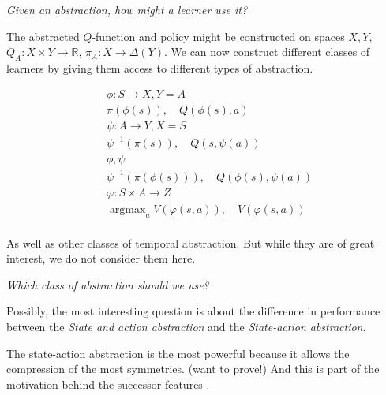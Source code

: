 %

\begin{displayquote}
\textit{Given an abstraction, how might a learner use it?}
\end{displayquote}

The abstracted $Q$-function and policy might be constructed on spaces $X, Y$,
$Q_A: X \times Y \to \mathbb R$, $\pi_A: X \to \Delta(Y)$. We can now construct
different classes of learners by giving them access to different types of abstraction.

\begin{align*}
&\phi: S \to X, Y = A \\
&\pi(\phi(s)),\quad Q(\phi(s), a) \tag{State abstraction} \\
&\psi: A\to Y, X = S\\
&\psi^{-1}(\pi(s)),\quad Q(s, \psi(a)) \tag{Action abstraction} \\
&\phi, \psi\\
&\psi^{-1}(\pi(\phi(s))),\quad Q(\phi(s), \psi(a)) \tag{State and action abstraction} \\
&\varphi: S \times A \to Z \\
&\mathop{\text{argmax}}_a V(\varphi(s, a)),\quad V(\varphi(s, a)) \tag{State-action abstraction} \\
\end{align*}

As well as other classes of temporal abstraction. But while they are of great
interest, we do not consider them here.

\begin{displayquote}
\textit{Which class of abstraction should we use?}
\end{displayquote}

Possibly, the most interesting question is about the difference in performance between
the \textit{State and action abstraction} and the \textit{State-action abstraction}.

The state-action abstraction is the most powerful because it allows the compression of the most symmetries. (want to
prove!) And this is part of the motivation behind the successor features \cite{Barreto2017,Dayan1993}.

